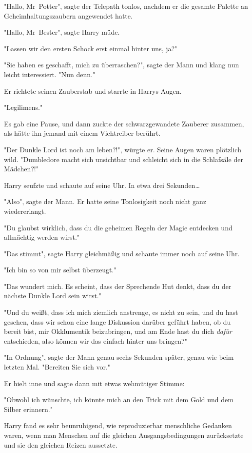 {"Hallo, Mr~Potter", sagte der Telepath tonlos, nachdem er die gesamte Palette an Geheimhaltungszaubern angewendet hatte.

"Hallo, Mr~Bester", sagte Harry müde.

"Lassen wir den ersten Schock erst einmal hinter uns, ja?"

"Sie haben es geschafft, mich zu überraschen?", sagte der Mann und klang nun leicht interessiert. "Nun denn."

Er richtete seinen Zauberstab und starrte in Harrys Augen.

"Legilimens."

Es gab eine Pause, und dann zuckte der schwarzgewandete Zauberer zusammen, als hätte ihn jemand mit einem Viehtreiber berührt.

"Der Dunkle Lord ist noch am leben?!", würgte er. Seine Augen waren plötzlich wild. "Dumbledore macht sich unsichtbar und schleicht sich in die Schlafsäle der Mädchen?!"

Harry seufzte und schaute auf seine Uhr. In etwa drei Sekunden…

"Also", sagte der Mann. Er hatte seine Tonlosigkeit noch nicht ganz wiedererlangt.

"Du glaubst wirklich, dass du die geheimen Regeln der Magie entdecken und allmächtig werden wirst."

"Das stimmt", sagte Harry gleichmäßig und schaute immer noch auf seine Uhr.

"Ich bin so von mir selbst überzeugt."

"Das wundert mich. Es scheint, dass der Sprechende Hut denkt, dass du der nächste Dunkle Lord sein wirst."

"Und du weißt, dass ich mich ziemlich anstrenge, es nicht zu sein, und du hast gesehen, dass wir schon eine lange Diskussion darüber geführt haben, ob du bereit bist, mir Okklumentik beizubringen, und am Ende hast du dich \emph{dafür} entschieden, also können wir das einfach hinter uns bringen?"

"In Ordnung", sagte der Mann genau sechs Sekunden später, genau wie beim letzten Mal. "Bereiten Sie sich vor."

Er hielt inne und sagte dann mit etwas wehmütiger Stimme:

"Obwohl ich wünschte, ich könnte mich an den Trick mit dem Gold und dem Silber erinnern."

Harry fand es sehr beunruhigend, wie reproduzierbar menschliche Gedanken waren, wenn man Menschen auf die gleichen Ausgangsbedingungen zurücksetzte und sie den gleichen Reizen aussetzte.

}
